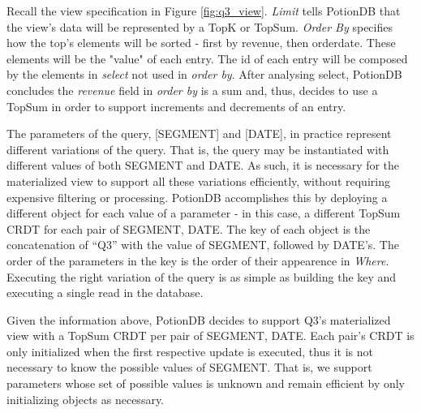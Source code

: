 \documentclass[sigconf, nonacm]{acmart}
\begin{document}
Recall the view specification in Figure \ref{fig:q3_view}.
\emph{Limit} tells PotionDB that the view's data will be represented by a TopK or TopSum.
\emph{Order By} specifies how the top's elements will be sorted - first by revenue, then orderdate.
These elements will be the "value" of each entry.
The id of each entry will be composed by the elements in \emph{select} not used in \emph{order by}. %
After analysing select, PotionDB concludes the \emph{revenue} field in \emph{order by} is a sum and, thus, decides to use a TopSum in order to support increments and decrements of an entry.

The parameters of the query, [SEGMENT] and [DATE], in practice represent different variations of the query.
That is, the query may be instantiated with different values of both SEGMENT and DATE.
As such, it is necessary for the materialized view to support all these variations efficiently, without requiring expensive filtering or processing.
PotionDB accomplishes this by deploying a different object for each value of a parameter - in this case, a different TopSum CRDT for each pair of SEGMENT, DATE. 
The key of each object is the concatenation of “Q3” with the value of SEGMENT, followed by DATE’s. 
The order of the parameters in the key is the order of their appearence in \emph{Where}. 
Executing the right variation of the query is as simple as building the key and executing a single read in the database.
 
 
 Given the information above, PotionDB decides to support Q3’s materialized view with a TopSum CRDT per pair of SEGMENT, DATE.
 Each pair's CRDT is only initialized when the first respective update is executed, thus it is not necessary to know the possible values of SEGMENT.
 That is, we support parameters whose set of possible values is unknown and remain efficient by only initializing objects as necessary.
 
\end{document}
